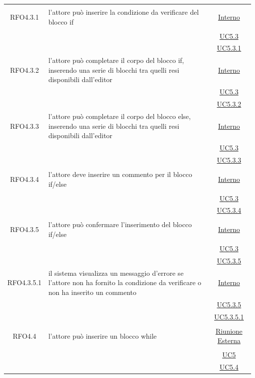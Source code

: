 \begin{longtable}{|c|>{\centering}m{7cm}|c|}
\hypertarget{RFO4.3.1}{RFO4.3.1} & l'attore può inserire la condizione da verificare del blocco if & \hyperlink{Interno}{Interno}\\
& &\hyperref[UC5.3]{UC5.3}\\
& &\hyperref[UC5.3.1]{UC5.3.1}\\ \hline

\hypertarget{RFO4.3.2}{RFO4.3.2} & l'attore può completare il corpo del blocco if, inserendo una serie di blocchi tra quelli resi disponibili dall'editor  & \hyperlink{Interno}{Interno}\\
& &\hyperref[UC5.3]{UC5.3}\\
& &\hyperref[UC5.3.2]{UC5.3.2}\\ \hline

\hypertarget{RFO4.3.3}{RFO4.3.3} & l'attore può completare il corpo del blocco else, inserendo una serie di blocchi tra quelli resi disponibili dall'editor   &\hyperlink{Interno}{Interno}\\
& &\hyperref[UC5.3]{UC5.3}\\
& &\hyperref[UC5.3.3]{UC5.3.3}\\ \hline

\hypertarget{RFO4.3.4}{RFO4.3.4} & l'attore deve inserire un commento per il blocco if/else & \hyperlink{Interno}{Interno}\\
& &\hyperref[UC5.3]{UC5.3}\\
& &\hyperref[UC5.3.4]{UC5.3.4}\\ \hline

\hypertarget{RFO4.3.5}{RFO4.3.5} & l'attore può confermare l'inserimento del blocco if/else & \hyperlink{Interno}{Interno}\\
& &\hyperref[UC5.3]{UC5.3}\\
& &\hyperref[UC5.3.5]{UC5.3.5}\\ \hline

\hypertarget{RFO4.3.5.1}{RFO4.3.5.1} & il sistema visualizza un messaggio d'errore se l'attore non ha fornito la condizione da verificare o non ha inserito un commento & \hyperlink{Interno}{Interno}\\
& &\hyperref[UC5.3.5]{UC5.3.5}\\
& &\hyperref[UC5.3.5.1]{UC5.3.5.1}\\ \hline

\hypertarget{RFO4.4}{RFO4.4} & l'attore può inserire un blocco while & \hyperlink{Riunione Esterna}{Riunione Esterna}\\
& &\hyperref[UC5]{UC5}\\
& &\hyperref[UC5.4]{UC5.4}\\ \hline


\end{longtable}
